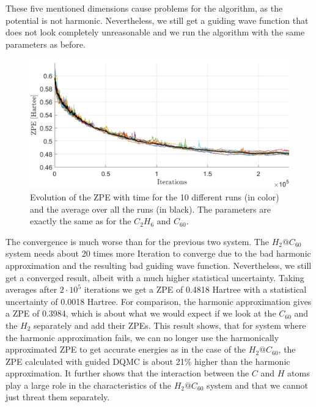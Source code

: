 \documentclass [12pt]{report}
\begin{document}
These five mentioned dimensions cause problems for the algorithm, as the potential is not harmonic. Nevertheless, we still get a guiding wave function that does not look completely unreasonable and we run the algorithm with the same parameters as before.
\begin{figure}[H]
\includegraphics[width=\linewidth] {h2@c60_1.png}
\caption{Evolution of the ZPE with time for the 10 different runs (in color) and the average over all the runs (in black). The parameters are exactly the same as for the $C_2H_6$ and $C_{60}$.} \label{h2@c60_1}
\end{figure}
The convergence is much worse than for the previous two system. The $H_2@C_{60}$ system needs about 20 times more Iteration to converge due to the bad harmonic approximation and the resulting bad guiding wave function. Nevertheless, we still get a converged result, albeit with a much higher statistical uncertainty. Taking averages after $2 \cdot 10^5$ iterations we get a ZPE of 0.4818 Hartree with a statistical uncertainty of 0.0018 Hartree. For comparison, the harmonic approximation gives a ZPE of 0.3984, which is about what we would expect if we look at the $C_{60}$ and the $H_2$ separately and add their ZPEs. This result shows, that for system where the harmonic approximation fails, we can no longer use the harmonically approximated ZPE to get accurate energies as in the case of the $H_2@C_{60}$, the ZPE calculated with guided DQMC is about 21\% higher than the harmonic approximation. It further shows that the interaction between the $C$ and $H$ atoms play a large role in the characteristics of the $H_2@C_{60}$ system and that we cannot just threat them separately.
\end{document}
